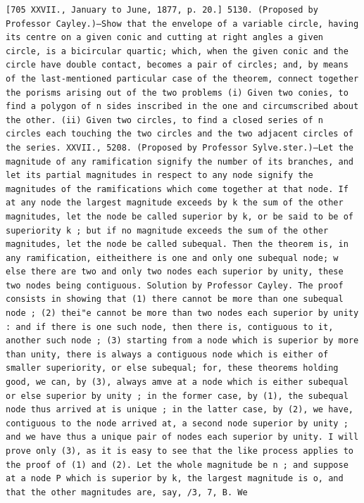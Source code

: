 \documentclass[12pt]{article}
\theoremstyle{plain}
\begin{document}
\newpage
\setcounter{page}{598}
\begin{verbatim}
[705 XXVII., January to June, 1877, p. 20.] 5130. (Proposed by Professor Cayley.)—Show that the envelope of a variable circle, having its centre on a given conic and cutting at right angles a given circle, is a bicircular quartic; which, when the given conic and the circle have double contact, becomes a pair of circles; and, by means of the last-mentioned particular case of the theorem, connect together the porisms arising out of the two problems (i) Given two conies, to find a polygon of n sides inscribed in the one and circumscribed about the other. (ii) Given two circles, to find a closed series of n circles each touching the two circles and the two adjacent circles of the series. XXVII., 5208. (Proposed by Professor Sylve.ster.)—Let the magnitude of any ramification signify the number of its branches, and let its partial magnitudes in respect to any node signify the magnitudes of the ramifications which come together at that node. If at any node the largest magnitude exceeds by k the sum of the other magnitudes, let the node be called superior by k, or be said to be of superiority k ; but if no magnitude exceeds the sum of the other magnitudes, let the node be called subequal. Then the theorem is, in any ramification, eitheithere is one and only one subequal node; w else there are two and only two nodes each superior by unity, these two nodes being contiguous. Solution by Professor Cayley. The proof consists in showing that (1) there cannot be more than one subequal node ; (2) thei"e cannot be more than two nodes each superior by unity : and if there is one such node, then there is, contiguous to it, another such node ; (3) starting from a node which is superior by more than unity, there is always a contiguous node which is either of smaller superiority, or else subequal; for, these theorems holding good, we can, by (3), always amve at a node which is either subequal or else superior by unity ; in the former case, by (1), the subequal node thus arrived at is unique ; in the latter case, by (2), we have, contiguous to the node arrived at, a second node superior by unity ; and we have thus a unique pair of nodes each superior by unity. I will prove only (3), as it is easy to see that the like process applies to the proof of (1) and (2). Let the whole magnitude be n ; and suppose at a node P which is superior by k, the largest magnitude is o, and that the other magnitudes are, say, /3, 7, B. We 
\end{verbatim}
\end{document}
